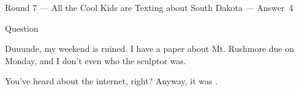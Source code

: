 \documentclass[11pt]{beamer}
\begin{document}
\begin{frame}[t]{Round 7 --- All the Cool Kids are Texting about South Dakota --- \mbox{Answer 4}}
\begin{block}{Question}

\begin{minipage}{0.9\textwidth}
\begin{mdframed}[
    roundcorner=7pt,
    backgroundcolor=black!5,
    linecolor=black!5,
    fontcolor=black,
    ignorelastdescenders]
\begin{flushleft}
{\small{}\selectfont{}
Duuuude, my weekend is ruined.  I have a paper about Mt. Rushmore due on Monday, and I don't even who the sculptor was.
}
\end{flushleft}
\end{mdframed}
\end{minipage}

\hfill{}\begin{minipage}{0.9\textwidth}
\begin{mdframed}[
    roundcorner=7pt,
    backgroundcolor=blue!80!white,
    linecolor=blue!80!white,
    fontcolor=white,
    ignorelastdescenders]
\begin{flushleft}
{\small{}\selectfont{}
You've heard about the internet, right? Anyway, it was \textunderscore{}\textunderscore{}\textunderscore{}\textunderscore{}\textunderscore{}\textunderscore{} \textunderscore{}\textunderscore{}\textunderscore{}\textunderscore{}\textunderscore{}\textunderscore{}.
}
\end{flushleft}
\end{mdframed}
\end{minipage}
\end{block}
\end{frame}
\end{document}
